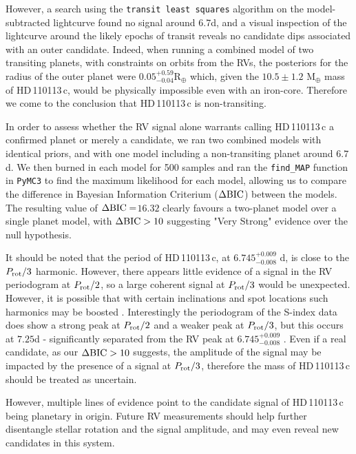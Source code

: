 \documentclass[fleqn,usenatbib]{mnras}
\newcommand{\rearth}{R$_{\oplus}$}
\newcommand{\mearth}{M$_{\oplus}$}
\newcommand{\TPone}{ $ 6.745^{+0.009}_{-0.008} $ }
\newcommand{\TMpone}{ $ 10.5 \pm 1.2 $ }
\newcommand{\Tplanetc}{HD\,110113\,c}
\newcommand{\TdeltaBIC}{$16.32$}
\begin{document}
However, a search using the \texttt{transit least squares} algorithm \citep{heller} on the model-subtracted lightcurve found no signal around 6.7d, and a visual inspection of the lightcurve around the likely epochs of transit reveals no candidate dips associated with an outer candidate.
Indeed, when running a combined model of two transiting planets, with constraints on orbits from the RVs, the posteriors for the radius of the outer planet were $0.05^{+0.59}_{−0.04}$\rearth{} which, given the \TMpone{}\mearth{} mass of \Tplanetc{}, would be physically impossible even with an iron-core.
Therefore we come to the conclusion that \Tplanetc{} is non-transiting.

In order to assess whether the RV signal alone warrants calling \Tplanetc{} a confirmed planet or merely a candidate, we ran two combined models with identical priors, and with one model including a non-transiting planet around $6.7$d.
We then burned in each model for 500 samples and ran the \texttt{find\_MAP} function in \texttt{PyMC3} to find the maximum likelihood for each model, allowing us to compare the difference in Bayesian Information Criterium ($\Delta{\rm BIC}$) between the models.
The resulting value of $\Delta{\rm BIC}= $\TdeltaBIC{} clearly favours a two-planet model over a single planet model, with $\Delta{\rm BIC}>10$ suggesting "Very Strong" evidence over the null hypothesis. 

It should be noted that the period of \Tplanetc{}, at \TPone{}d, is close to the $P_{\rm rot}/3$ harmonic.
However, there appears little evidence of a signal in the RV periodogram at $P_{\rm rot}/2$, so a large coherent signal at $P_{\rm rot}/3$ would be unexpected.
However, it is possible that with certain inclinations and spot locations such harmonics may be boosted \citep{vanderburg2016radial,boisse2011disentangling}.
Interestingly the periodogram of the S-index data does show a strong peak at $P_{\rm rot}/2$ and a weaker peak at $P_{\rm rot}/3$, but this occurs at $7.25$d - significantly separated from the RV peak at \TPone{}.
Even if a real candidate, as our $\Delta{\rm BIC}>10$ suggests, the amplitude of the signal may be impacted by the presence of a signal at $P_{\rm rot}/3$, therefore the mass of \Tplanetc{} should be treated as uncertain. 

However, multiple lines of evidence point to the candidate signal of \Tplanetc{} being planetary in origin.
Future RV measurements should help further disentangle stellar rotation and the signal amplitude, and may even reveal new candidates in this system.
\end{document}

